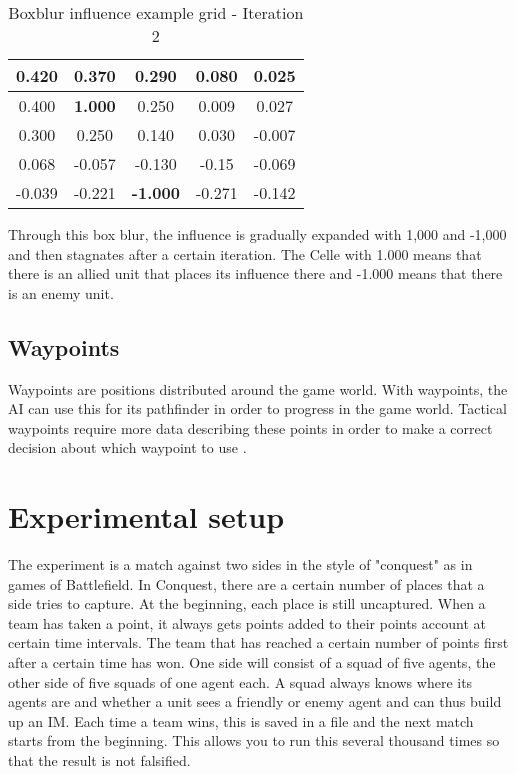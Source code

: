 \documentclass[]{report}
\begin{document}
\begin{table}[H]
	\centering
	\begin{tabular}{|c|c|c|c|c|}
		\hline
		0.420 & 0.370 & 0.290 & 0.080 & 0.025\\
		\hline
		0.400 & \textbf{1.000} & 0.250 & 0.009 & 0.027\\
		\hline
		0.300 & 0.250 & 0.140 & 0.030 & -0.007\\
		\hline
		0.068 & -0.057 & -0.130 & -0.15 & -0.069\\
		\hline
		-0.039 & -0.221 & \textbf{-1.000} & -0.271 & -0.142\\
		\hline
		
	\end{tabular}
	\caption{Boxblur influence example grid - Iteration 2}
	\label{tab:Boxblur grid Iteration 2}
\end{table}

Through this box blur, the influence is gradually expanded with 1,000 and -1,000 and then stagnates after a certain iteration. The Celle with 1.000 means that there is an allied unit that places its influence there and -1.000 means that there is an enemy unit.

\section{Waypoints}
Waypoints are positions distributed around the game world. With waypoints, the \ac{AI} can use this for its pathfinder in order to progress in the game world. Tactical waypoints require more data describing these points in order to make a correct decision about which waypoint to use \citep{AIforGamesTactical}.

\chapter{Experimental setup}
The experiment is a match against two sides in the style of "conquest" as in games of Battlefield. In Conquest, there are a certain number of places that a side tries to capture. At the beginning, each place is still uncaptured. When a team has taken a point, it always gets points added to their points account at certain time intervals. The team that has reached a certain number of points first after a certain time has won. 
One side will consist of a squad of five agents, the other side of five squads of one agent each. A squad always knows where its agents are and whether a unit sees a friendly or enemy agent and can thus build up an \ac{IM}.
Each time a team wins, this is saved in a file and the next match starts from the beginning. This allows you to run this several thousand times so that the result is not falsified.
\end{document}

